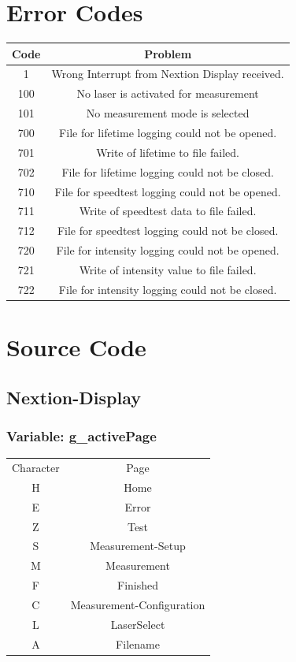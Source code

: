	\section{Error Codes}
		\begin{tabular}{|c|c|}
			\hline 
			Code & Problem \\ 
			\hline 
			1 & Wrong Interrupt from Nextion Display received.\\
			\hline
			\hline
			100 & No laser is activated for measurement \\ 
			\hline 
			101 & No measurement mode is selected \\
			\hline
			\hline
			700 & File for lifetime logging could not be opened. \\ 
			\hline 
			701 & Write of lifetime to file failed.   \\ 
			\hline 
			702 & File for lifetime logging could not be closed. \\ 
			\hline 
			710 & File for speedtest logging could not be opened. \\ 
			\hline 
			711 & Write of speedtest data to file failed.   \\ 
			\hline 
			712 & File for speedtest logging could not be closed. \\ 
			\hline 		
			720 & File for intensity logging could not be opened. \\ 
			\hline 
			721 & Write of intensity value to file failed.   \\ 
			\hline 
			722 & File for intensity logging could not be closed. \\ 
			\hline 
		\end{tabular} 
	
	\section{Source Code}
	\subsection{Nextion-Display}
		\subsubsection{Variable: g\_activePage}
			\begin{tabular}{|c|c|}
			Character & Page \\
			H & Home \\
			E & Error \\
			Z & Test \\
			S & Measurement-Setup \\
			M & Measurement \\
			F & Finished \\
			C & Measurement-Configuration \\
			L & LaserSelect \\
			A & Filename
			\end{tabular}
		